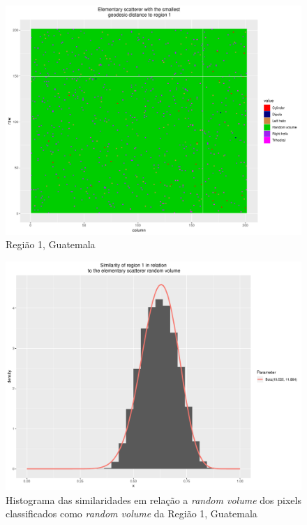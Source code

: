 \documentclass[12pt]{article}
\begin{document}
\begin{figure}[!h]
    \centering    
    \includegraphics[width = 0.85\linewidth]{../../Images/Report_18_12_20/Classifier_Geo_Dist/Class_Map/Guate/region1_predomain.pdf}
    \caption{Região 1, Guatemala}
    \label{fig:class_map_r1}
\end{figure}

\begin{figure}[!h]
    \centering   
    \includegraphics[width = 0.85\linewidth]{../../Images/Report_18_12_20/Classifier_Geo_Dist/Histograms/Guate/region1_rv_sm_filter.pdf}
    \caption{Histograma das similaridades em relação a \textit{random volume} dos pixels classificados como \textit{random volume} da Região 1, Guatemala}
    \label{fig:class_hist_r1_rv}
\end{figure}
\end{document}
